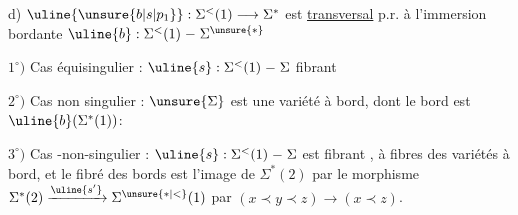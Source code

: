 d) $\uline{\unsure{b|s|p_1}}:\Sigma^{<}(1)\longrightarrow\Sigma^*$ est \uline{transversal} p.r. à l'immersion
bordante $\uline{b}:\Sigma^{<}(1)\mathrel{-}\Sigma^{\unsure{*}}$

$1^{\circ})$ Cas équisingulier : $\uline{s}:\Sigma^{<}(1)\mathrel{-}\Sigma$ fibrant 

$2^{\circ})$ Cas non singulier : $\unsure{\Sigma}$ est une variété à bord,
dont le bord est $\uline{b}(\Sigma^{*}(1))$:

$3^{\circ})$ Cas -non-singulier : $\uline{s}:\Sigma^{<}(1)\mathrel{-}\Sigma$ est
fibrant , à fibres des variétés à bord, et le
fibré des bords est l'image de $\Sigma^{*}(2)$ par
le morphisme $\Sigma^{*}(2)\xrightarrow{\uline{s'}}\Sigma^{\unsure{*|<}}(1)$ 
par $(x\prec y\prec z)\longrightarrow(x\prec z)$.

